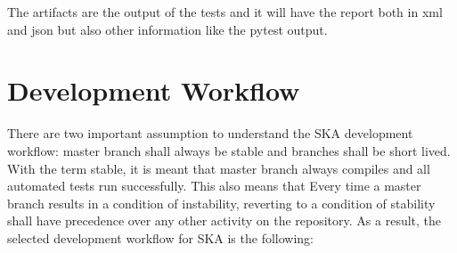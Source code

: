 \documentclass[a4paper]{spie}  %
\begin{document}
The artifacts are the output of the tests and it will have the report both in xml and json but also other information like the pytest output.

\section{Development Workflow}
There are two important assumption to understand the SKA development workflow: master branch shall always be stable and branches shall be short lived. With the term stable, it is meant that master branch always compiles and all automated tests run successfully. This also means that Every time a master branch results in a condition of instability, reverting to a condition of stability shall have
precedence over any other activity on the repository.
As a result, the selected development workflow for SKA is the following:
\end{document}
